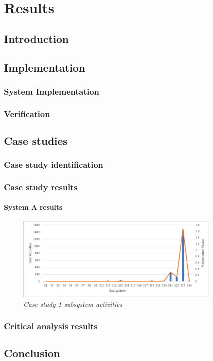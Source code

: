 \chapter{Results}
\label{chap:3}

\section{Introduction}

\section{Implementation}

\subsection{System Implementation}

\subsection{Verification}

\section{Case studies}

\subsection{Case study identification}

\subsection{Case study results}

\subsubsection{System A results}

\begin{figure}[!htb]
	\centering %
	\includegraphics[width=0.9\textwidth]{img/ch3/uat/systemA/s1_s24.png}
	\caption[Case study 1 subsystem activities]
	{\textit{Case study 1 subsystem activities}}\label{fig:ch3_saS1S24}
\end{figure} 

\subsection{Critical analysis results}

\section{Conclusion}